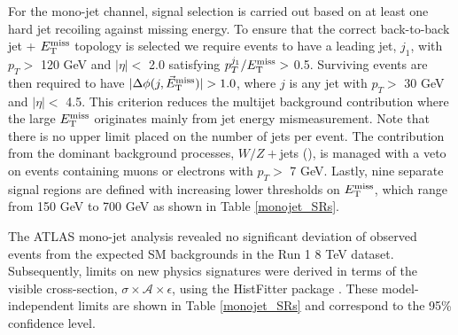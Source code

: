 For the mono-jet channel, signal selection is carried out based on at least one hard jet recoiling against missing energy. To ensure that the correct back-to-back jet + $E_{\mathrm{T}}^{\mathrm{miss}}$ topology is selected we require events to have a leading jet, $j_{1}$, with $p_{T} >$ 120 GeV and $|\eta| <$ 2.0 satisfying $p_{T}^{j_{1}}/E_{\mathrm{T}}^{\mathrm{miss}} >$ 0.5. Surviving events are then required to have $|\Delta\phi(j,\metvec)|>1.0$, where $j$ is any jet with $p_{T} >$ 30 GeV and $|\eta| <$ 4.5. This criterion reduces the multijet background contribution where the large $E_{\mathrm{T}}^{\mathrm{miss}}$ originates mainly from jet energy mismeasurement. Note that there is no upper limit placed on the number of jets per event. The contribution from the dominant background processes, $W/Z+$jets (), is managed with a veto on events containing muons or electrons with $p_{T}>$ 7 GeV.  Lastly, nine separate signal regions are defined with increasing lower thresholds on $E_{\mathrm{T}}^{\mathrm{miss}}$, which range from 150 GeV to 700 GeV as shown in Table \ref{monojet_SRs}.

The ATLAS mono-jet analysis revealed no significant deviation of observed events from the expected SM backgrounds in the Run 1 8 TeV dataset. Subsequently, limits on new physics signatures were derived in terms of the visible cross-section, $\sigma\times\mathcal{A}\times\epsilon$, using the HistFitter package \cite{}. These model-independent limits are shown in Table \ref{monojet_SRs} and correspond to the 95\% confidence level.

